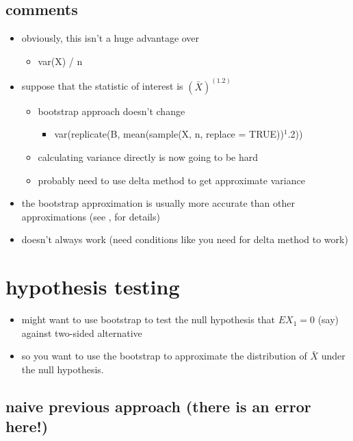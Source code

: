 \subsection{comments}

\begin{itemize}
\item obviously, this isn't a huge advantage over
\begin{itemize}
\item var(X) / n
\end{itemize}
\item suppose that the statistic of interest is $(\bar X)^(1.2)$
\begin{itemize}
\item bootstrap approach doesn't change
\begin{itemize}
\item var(replicate(B, mean(sample(X, n, replace = TRUE))$^1$.2))
\end{itemize}
\item calculating variance directly is now going to be hard
\item probably need to use delta method to get approximate variance
\end{itemize}
\item the bootstrap approximation is usually more accurate than
       other approximations (see \citealp{Hal_1991}, for details)
\item doesn't always work (need conditions like you need for delta
       method to work)
\end{itemize}

\section{hypothesis testing}

\begin{itemize}
\item might want to use bootstrap to test the null hypothesis that 
      $E X_1 = 0$ (say) against two-sided alternative
\item so you want to use the bootstrap to approximate the distribution
      of $\bar X$ under the null hypothesis.
\end{itemize}

\subsection{naive previous approach (there is an error here!)}

